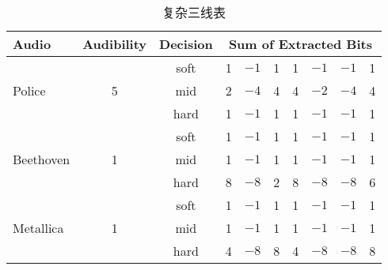 \begin{table}[ht]
  \centering
  \caption{复杂三线表}
  \begin{tabular}{l c c rrrrrrr}
    \hline\hline
    Audio & Audibility & Decision & \multicolumn{7}{c}{Sum of Extracted Bits}
    \\ [0.5ex]
    \hline
    \multirow{3}{*}{Police} & \multirow{3}{*}{5} & soft & 1 & $-1$ & 1 & 1 & $-1$ & $-1$ & 1 \\
    & & mid & 2 & $-4$ & 4 & 4 & $-2$ & $-4$ & 4 \\
    & & hard & 1 & $-1$ & 1 & 1 & $-1$ & $-1$ & 1 \\
    \multirow{3}{*}{Beethoven} & \multirow{3}{*}{1} & soft & 1 & $-1$ & 1 & 1 & $-1$ & $-1$ & 1 \\
    & & mid & 1 & $-1$ & 1 & 1 & $-1$ & $-1$ & 1 \\
    & & hard & 8 & $-8$ & 2 & 8 & $-8$ & $-8$ & 6 \\
    \multirow{3}{*}{Metallica} & \multirow{3}{*}{1} & soft & 1 & $-1$ & 1 & 1 & $-1$ & $-1$ & 1 \\
    & & mid & 1 & $-1$ & 1 & 1 & $-1$ & $-1$ & 1 \\
    & & hard & 4 & $-8$ & 8 & 4 & $-8$ & $-8$ & 8 \\




    \hline %
  \end{tabular}
  \label{tab:PPer}
\end{table}

